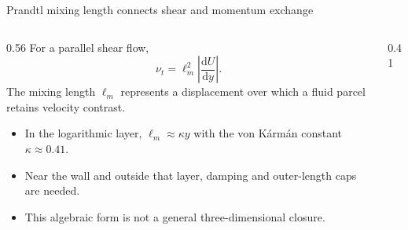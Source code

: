 \documentclass[aspectratio=169,11pt]{beamer}
\newcommand{\mean}[1]{\overline{#1}}
\begin{document}
\begin{frame}{Prandtl mixing length connects shear and momentum exchange}
\begin{columns}[T,onlytextwidth]
\begin{column}{0.56\textwidth}
For a parallel shear flow,
\[
  \nu_t=\ell_m^2\left|\frac{\mathrm dU}{\mathrm dy}\right|.
\]
The mixing length $\ell_m$ represents a displacement over which a fluid parcel retains velocity contrast.

\begin{itemize}\itemsep3pt
  \item In the logarithmic layer, $\ell_m\approx\kappa y$ with the von K\'arm\'an constant $\kappa\approx0.41$.
  \item Near the wall and outside that layer, damping and outer-length caps are needed.
  \item This algebraic form is not a general three-dimensional closure.
\end{itemize}
\end{column}
\begin{column}{0.41\textwidth}
\centering
{}
\end{column}
\end{columns}
\end{frame}
\end{document}

